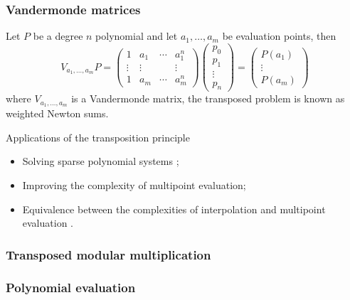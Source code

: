 \documentclass[10pt]{beamer}
\renewcommand{\emph}[1]{{\usebeamercolor[fg]{structure}#1}}
\begin{document}
\begin{frame}
  \frametitle{Vandermonde matrices}

  Let $P$ be a degree $n$ polynomial and let $a_1,\ldots,a_m$ be
  evaluation points, then
  \begin{equation*}
    V_{a_1,\ldots,a_m}P =
    \begin{pmatrix}
      1 & a_1 & \cdots & a_1^n\\
      \vdots & \vdots & & \vdots\\
      1 & a_m & \cdots & a_m^n
    \end{pmatrix}
    \begin{pmatrix}
      p_0\\p_1\\\vdots\\p_n
    \end{pmatrix}
    =
    \begin{pmatrix}
      P(a_1)\\\vdots\\P(a_m)
    \end{pmatrix}
  \end{equation*}
  where $V_{a_1,\ldots,a_m}$ is a Vandermonde matrix, the transposed
  problem is known as \emph{weighted Newton sums}.

  \begin{block}{Applications of the transposition principle}
    \begin{itemize}
    \item Solving sparse polynomial systems
      \parencite{canny+kaltofen+yagati89};
    \item Improving the complexity of multipoint evaluation;
    \item Equivalence between the complexities of interpolation and
      multipoint evaluation \parencite{bostan+schost04}.
    \end{itemize}
  \end{block}
\end{frame}


\begin{frame}
  \frametitle{Transposed modular multiplication}
  
\end{frame}


\begin{frame}
  \frametitle{Polynomial evaluation}
  
\end{frame}
\end{document}
